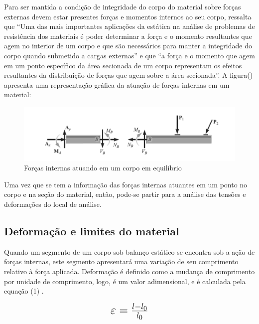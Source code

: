 Para ser mantida a condição de integridade do corpo do material sobre forças externas devem estar presentes forças e momentos internos ao seu corpo, \autocite{Hibbeler2010} ressalta que “Uma das mais importantes aplicações da estática na análise de problemas de resistência dos materiais é poder determinar a força e o momento resultantes que agem no interior de um corpo e que são necessários para manter a integridade do corpo quando submetido a cargas externas” e que “a força e o momento que agem em um ponto específico da área secionada de um corpo representam os efeitos resultantes da distribuição de forças que agem sobre a área secionada”. A figura() apresenta uma representação gráfica da atuação de forças internas em um material:

\begin{figure}[htb]
	\caption{\label{fig:1010} Forças internas atuando em um corpo em equilíbrio}
	\begin{center}
		\includegraphics[width=\textwidth]{pictures/1010.png}
	\end{center}
\end{figure}

Uma vez que se tem a informação das forças internas atuantes em um ponto no corpo e na seção do material, então, pode-se partir para a análise das tensões e deformações do local de análise.

\subsection{Deformação e limites do material}

Quando um segmento de um corpo sob balanço estático se encontra sob a ação de forças internas, este segmento apresentará uma variação de seu comprimento relativo à força aplicada. Deformação é definido como a mudança de comprimento por unidade de comprimento, logo, é um valor adimensional, e é calculada pela equação (1) \autocite{Norton2011}.

\begin{equation}\label{eq:Eq_130}%
\mbox{\fontsize{17.28}{21.6}\selectfont\( %
\varepsilon = \frac{l - l_0}{l_0}
\)} %
\end{equation}

